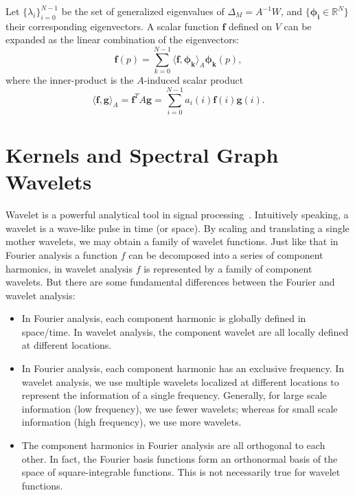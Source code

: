 Let $\{\lambda_i\}_{i=0}^{N-1}$ be the set of generalized eigenvalues of
 $\Delta_M=A^{-1}W$, and $\{\mathbf{\phi_i}\in\mathbb{R}^N\}$ their corresponding
eigenvectors. A scalar function $\mathbf{f}$ defined on $V$ can be expanded as
the linear combination of the eigenvectors:
\begin{equation}
\mathbf{f}(p)=\sum_{k=0}^{N-1}\langle \mathbf{f},\mathbf{\phi_k}\rangle_A \mathbf{\phi_k}(p),
\end{equation}
where the inner-product is the $A$-induced scalar product
\begin{equation}
\langle \mathbf{f},\mathbf{g}\rangle_A = \mathbf{f}^T A\mathbf{g}=\sum_{i=0}^{N-1}a_i(i)\mathbf{f}(i)\mathbf{g}(i).
\end{equation}

\section{Kernels and Spectral Graph Wavelets}
Wavelet is a powerful analytical tool in signal processing~\cite{Mallat2008}.
Intuitively speaking, a wavelet is a wave-like pulse in time (or space). By scaling and translating a single mother wavelets,
we may obtain a family of wavelet functions. Just like that in Fourier analysis a function $f$ can be decomposed into a series
of component harmonics, in wavelet analysis $f$ is represented by a family of component wavelets.
But there are some fundamental differences between the Fourier and wavelet analysis:

\begin{itemize}
\item In Fourier analysis, each component harmonic is globally defined in space/time. In wavelet analysis, the component wavelet are all locally defined at different locations.
\item In Fourier analysis, each component harmonic has an exclusive frequency. In wavelet analysis, we use multiple wavelets localized at different locations to represent the information of a single frequency. Generally, for large scale information (low frequency), we use fewer wavelets; whereas for small scale information (high frequency), we use more wavelets.
\item The component harmonics in Fourier analysis are all orthogonal to each other. In fact, the Fourier basis functions form an orthonormal basis of the space of square-integrable functions. This is not necessarily true for wavelet functions.
\end{itemize}

